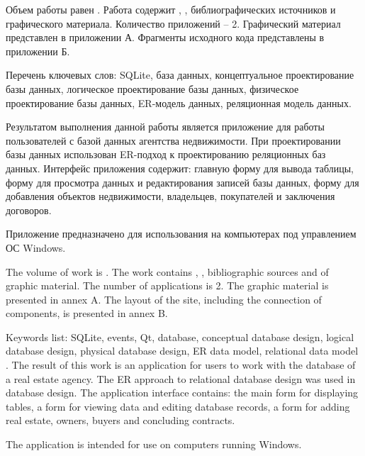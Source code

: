 
Объем работы равен . Работа содержит , ,  библиографических источников и  графического материала. Количество приложений – 2. Графический материал представлен в приложении А. Фрагменты исходного кода представлены в приложении Б.

Перечень ключевых слов: SQLite, база данных, концептуальное проектирование базы данных, логическое проектирование базы данных, физическое проектирование базы данных, ER-модель данных, реляционная модель данных.

Результатом выполнения данной работы является приложение для работы пользователей с базой данных агентства недвижимости. При проектировании базы данных использован ER-подход к проектированию реляционных баз данных. Интерфейс приложения содержит: главную форму для вывода таблицы, форму для просмотра данных и редактирования записей базы данных, форму для добавления объектов недвижимости, владельцев, покупателей и заключения договоров.

Приложение предназначено для использования на компьютерах под управлением ОС Windows. 


  
The volume of work is . The work contains , ,  bibliographic sources and  of graphic material. The number of applications is 2. The graphic material is presented in annex A. The layout of the site, including the connection of components, is presented in annex B.

  Keywords list: SQLite, events, Qt, database, conceptual database design, logical database design, physical database design, ER data model, relational data model
  .
The result of this work is an application for users to work with the database of a real estate agency. The ER approach to relational database design was used in database design. The application interface contains: the main form for displaying tables, a form for viewing data and editing database records, a form for adding real estate, owners, buyers and concluding contracts.

The application is intended for use on computers running Windows.

